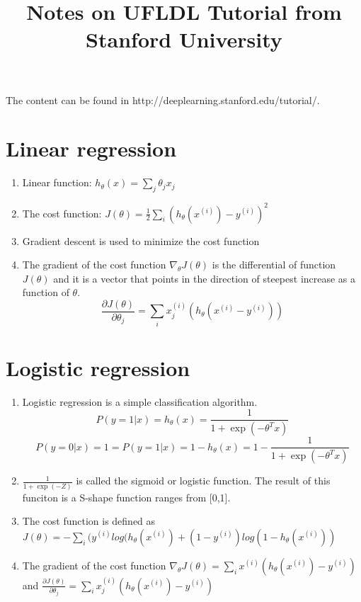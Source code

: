 \documentclass[12pt]{article}
\begin{document}
\title{Notes on UFLDL Tutorial from Stanford University}
\maketitle

The content can be found in http://deeplearning.stanford.edu/tutorial/.

\section{Linear regression}
\begin{enumerate}
 \item Linear function: $h_\theta (x) = \sum_j {\theta_j x_j} $
 \item The cost function: $J(\theta) = \frac{1}{2} \sum_i{(h_\theta (x^{(i)}) - y^{(i)})^2}$
 \item Gradient descent is used to minimize the cost function
 \item The gradient of the cost function $\nabla_\theta J(\theta)$ is the differential of function $J(\theta)$ and it is a vector that points in the direction of steepest increase as a function of $\theta$.$$\frac{\partial J(\theta)}{\partial \theta_j} = \sum_i {x_j^{(i)} (h_\theta (x^{(i)} - y^{(i)}))}$$ 
\end{enumerate}

\section{Logistic regression}
\begin{enumerate}
 \item Logistic regression is a simple classification algorithm.
 $$P(y=1|x)=h_\theta (x) = \frac{1}{1 + \exp(-\theta^T x)}$$
 $$P(y=0|x)=1=P(y=1|x) = 1-h_\theta (x) = 1-\frac{1}{1 + \exp(-\theta^T x)}$$
 \item $\frac{1}{1+\exp(-Z)}$ is called the sigmoid or logistic function. The result of this funciton is a S-shape function ranges from [0,1].
 \item The cost function is defined as $J(\theta)=-\sum_i {(y^{(i)} log(h_\theta (x^{(i)}) + (1-y^{(i)}) log(1-h_\theta(x^{(i)}))}$
 \item The gradient of the cost function $\nabla_\theta J(\theta) = \sum_i {x^{(i)} (h_\theta (x^{(i)}) - y^{(i)})}$ and $\frac{\partial J(\theta)}{\partial \theta_j} = \sum_i {x_j^{(i)} (h_\theta (x^{(i)}) - y^{(i)})}$
\end{enumerate}
\end{document}
